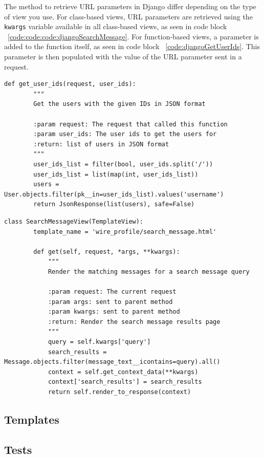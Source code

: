 The method to retrieve URL parameters in Django differ depending on the type
of view you use. For class-based views, URL parameters are retrieved using
the \texttt{kwargs} variable available in all class-based views, as seen in
code block ~\ref{code:code:code:djangoSearchMessage}. For function-based views, a
parameter is added to the function itself, as seen in code block ~\ref{code:djangoGetUserIds}. 
This parameter is then populated with the value of the URL parameter sent in a request.

\begin{lstlisting}[caption={Function-based view for returning user data},label={code:djangoGetUserIds}]
    def get_user_ids(request, user_ids):
        """
        Get the users with the given IDs in JSON format

        :param request: The request that called this function
        :param user_ids: The user ids to get the users for
        :return: list of users in JSON format
        """
        user_ids_list = filter(bool, user_ids.split('/'))
        user_ids_list = list(map(int, user_ids_list))
        users = User.objects.filter(pk__in=user_ids_list).values('username')
        return JsonResponse(list(users), safe=False)
\end{lstlisting}

\begin{lstlisting}[caption={Class-based view to search for a given message},label={code:djangoSearchMessage}]
    class SearchMessageView(TemplateView):
        template_name = 'wire_profile/search_message.html'

        def get(self, request, *args, **kwargs):
            """
            Render the matching messages for a search message query

            :param request: The current request
            :param args: sent to parent method
            :param kwargs: sent to parent method
            :return: Render the search message results page
            """
            query = self.kwargs['query']
            search_results = Message.objects.filter(message_text__icontains=query).all()
            context = self.get_context_data(**kwargs)
            context['search_results'] = search_results
            return self.render_to_response(context)
\end{lstlisting}

\subsection{Templates}

\subsection{Tests}
